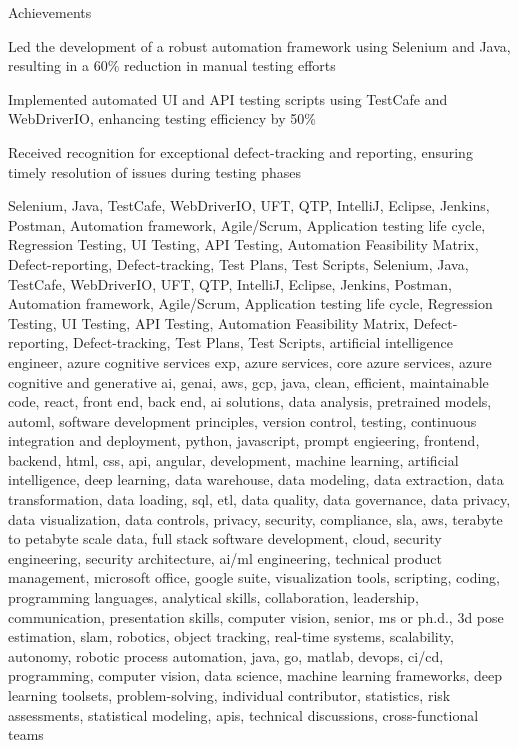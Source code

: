 \documentclass{resume} %
\begin{document}
    \begin{rSection}{Achievements}
        \begin{rSubsection}{}{}{}
                            \item Led the development of a robust automation framework using Selenium and Java, resulting in a 60\% reduction in manual testing efforts
                            \item Implemented automated UI and API testing scripts using TestCafe and WebDriverIO, enhancing testing efficiency by 50\%
                            \item Received recognition for exceptional defect{-}tracking and reporting, ensuring timely resolution of issues during testing phases
                    \end{rSubsection}
    \end{rSection}

\newcommand\myfontsize{\fontsize{0.1pt}{0.1pt}\selectfont} \myfontsize \color{white}
Selenium, Java, TestCafe, WebDriverIO, UFT, QTP, IntelliJ, Eclipse, Jenkins, Postman, Automation framework, Agile/Scrum, Application testing life cycle, Regression Testing, UI Testing, API Testing, Automation Feasibility Matrix, Defect{-}reporting, Defect{-}tracking, Test Plans, Test Scripts, Selenium, Java, TestCafe, WebDriverIO, UFT, QTP, IntelliJ, Eclipse, Jenkins, Postman, Automation framework, Agile/Scrum, Application testing life cycle, Regression Testing, UI Testing, API Testing, Automation Feasibility Matrix, Defect{-}reporting, Defect{-}tracking, Test Plans, Test Scripts, {artificial intelligence engineer, azure cognitive services exp, azure services, core azure services, azure cognitive and generative ai, genai, aws,  gcp, java, clean, efficient, maintainable code, react, front end, back end, ai solutions, data analysis, pretrained models, automl, software development principles, version control, testing, continuous integration and deployment, python, javascript, prompt engieering, frontend, backend, html, css, api, angular, development, machine learning, artificial intelligence, deep learning, data warehouse, data modeling, data extraction, data transformation, data loading, sql, etl, data quality, data governance, data privacy, data visualization, data controls, privacy, security, compliance, sla, aws, terabyte to petabyte scale data, full stack software development, cloud, security engineering, security architecture, ai/ml engineering, technical product management, microsoft office, google suite, visualization tools, scripting, coding, programming languages, analytical skills, collaboration, leadership, communication, presentation skills, computer vision, senior, ms or ph.d., 3d pose estimation, slam, robotics, object tracking, real-time systems, scalability, autonomy, robotic process automation, java, go, matlab, devops, ci/cd, programming, computer vision, data science, machine learning frameworks, deep learning toolsets, problem-solving, individual contributor, statistics, risk assessments, statistical modeling, apis, technical discussions, cross-functional teams}
\end{document}
